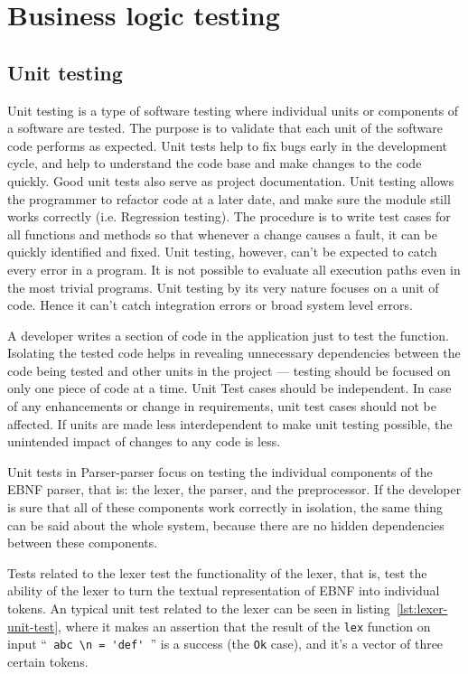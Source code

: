 \documentclass[english,engineering]{wizthesis}
\newcommand{\paraphrase}[1]{#1}
\newcommand{\thisproject}{Parser-parser}
\begin{document}
\section{Business logic testing} \label{sec:testing}

\subsection{Unit testing}

\paraphrase{Unit testing is a type of software testing where individual units or
components of a software are tested. The purpose is to validate that each unit
of the software code performs as expected. Unit tests help to fix bugs early in
the development cycle, and help to understand the code base and make changes to
the code quickly. Good unit tests also serve as project documentation. Unit
testing allows the programmer to refactor code at a later date, and make sure
the module still works correctly (i.e. Regression testing). The procedure is to
write test cases for all functions and methods so that whenever a change causes
a fault, it can be quickly identified and fixed. Unit testing, however, can't be
expected to catch every error in a program. It is not possible to evaluate all
execution paths even in the most trivial programs. Unit testing by its very
nature focuses on a unit of code. Hence it can't catch integration errors or
broad system level errors.

A developer writes a section of code in the application just to test the
function. Isolating the tested code helps in revealing unnecessary dependencies
between the code being tested and other units in the project --- testing should
be focused on only one piece of code at a time. Unit Test cases should be
independent. In case of any enhancements or change in requirements, unit test
cases should not be affected. If units are made less interdependent to make unit
testing possible, the unintended impact of changes to any code is less.}

Unit tests in \thisproject{} focus on testing the individual components of the
EBNF parser, that is: the lexer, the parser, and the preprocessor. If the
developer is sure that all of these components work correctly in isolation, the
same thing can be said about the whole system, because there are no hidden
dependencies between these components.

Tests related to the lexer test the functionality of the lexer, that is, test
the ability of the lexer to turn the textual representation of EBNF into
individual tokens. An typical unit test related to the lexer can be seen in
listing~\ref{lst:lexer-unit-test}, where it makes an assertion that the result
of the \texttt{lex} function on input ``\verb*| abc \n = 'def' |'' is a success
(the \texttt{Ok} case), and it's a vector of three certain tokens.
\end{document}
